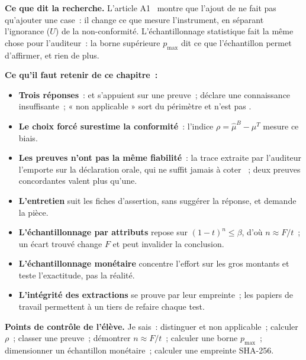 \begin{boxinfo}
\textbf{Ce que dit la recherche.} L'article A1~\cite{minka2026nek} montre
que l'ajout de \NEK{} ne fait pas qu'ajouter une case~: il change ce que
mesure l'instrument, en séparant l'ignorance ($U$) de la non-conformité.
L'échantillonnage statistique fait la même chose pour l'auditeur~: la borne
supérieure $p_{\max}$ dit ce que l'échantillon permet d'affirmer, et rien de
plus.
\end{boxinfo}

\separateur

\begin{boxresume}
\textbf{Ce qu'il faut retenir de ce chapitre~:}
\begin{itemize}
    \item \textbf{Trois réponses}~: \OUI{} et \NON{} s'appuient sur une
          preuve~; \NEK{} déclare une connaissance insuffisante~; « non
          applicable » sort du périmètre et n'est pas \NEK{}.
    \item \textbf{Le choix forcé surestime la conformité}~: l'indice
          $\rho = \hat{\mu}^{B} - \mu^{T}$ mesure ce biais.
    \item \textbf{Les preuves n'ont pas la même fiabilité}~: la trace extraite
          par l'auditeur l'emporte sur la déclaration orale, qui ne suffit
          jamais à coter \OUI{}~; deux preuves concordantes valent plus
          qu'une.
    \item \textbf{L'entretien} suit les fiches d'assertion, sans suggérer la
          réponse, et demande la pièce.
    \item \textbf{L'échantillonnage par attributs} repose sur $(1-t)^n \le
          \beta$, d'où $n \approx F/t$~; un écart trouvé change $F$ et peut
          invalider la conclusion.
    \item \textbf{L'échantillonnage monétaire} concentre l'effort sur les
          gros montants et teste l'exactitude, pas la réalité.
    \item \textbf{L'intégrité des extractions} se prouve par leur empreinte~;
          les papiers de travail permettent à un tiers de refaire chaque test.
\end{itemize}
\end{boxresume}

\begin{boxinfo}
\textbf{Points de contrôle de l'élève.} Je sais~: distinguer \NEK{} et non
applicable~; calculer $\rho$~; classer une preuve~; démontrer $n \approx
F/t$~; calculer une borne $p_{\max}$~; dimensionner un échantillon
monétaire~; calculer une empreinte SHA-256.
\end{boxinfo}

